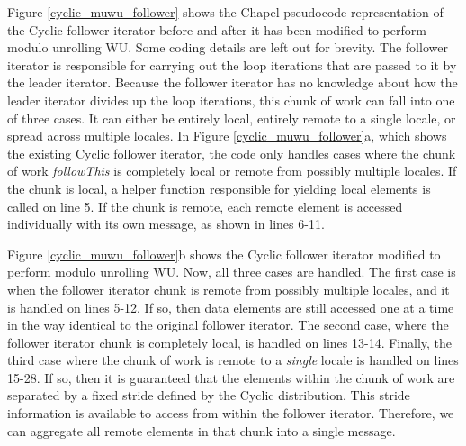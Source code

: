 Figure \ref{cyclic_muwu_follower} shows the Chapel pseudocode representation of the Cyclic follower iterator before and after it has been modified to perform modulo unrolling WU. Some coding details are left out for brevity. The follower iterator is responsible for carrying out the loop iterations that are passed to it by the leader iterator. Because the follower iterator has no knowledge about how the leader iterator divides up the loop iterations, this chunk of work can fall into one of three cases. It can either be entirely local, entirely remote to a single locale, or spread across multiple locales. In Figure \ref{cyclic_muwu_follower}a, which shows the existing Cyclic follower iterator, the code only handles cases where the chunk of work \textit{followThis} is completely local or remote from possibly multiple locales. If the chunk is local, a helper function responsible for yielding local elements is called on line 5. If the chunk is remote, each remote element is accessed individually with its own message, as shown in lines 6-11. 

Figure \ref{cyclic_muwu_follower}b shows the Cyclic follower iterator modified to perform modulo unrolling WU. Now, all three cases are handled. The first case is when the follower iterator chunk is remote from possibly multiple locales, and it is handled on lines 5-12. If so, then data elements are still accessed one at a time in the way identical to the original follower iterator. The second case, where the follower iterator chunk is completely local, is handled on lines 13-14. Finally, the third case where the chunk of work is remote to a \textit{single} locale is handled on lines 15-28. If so, then it is guaranteed that the elements within the chunk of work are separated by a fixed stride defined by the Cyclic distribution. This stride information is available to access from within the follower iterator. Therefore, we can aggregate all remote elements in that chunk into a single message.

